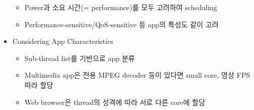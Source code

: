 \begin{itemize}
    \begin{itemize}
        \item Power과 소요 시간(= performance)를 모두 고려하여 scheduling
        \item Performance-sensitive/QoS-sensitive 등 app의 특성도 같이 고려
    \end{itemize}
    \item Considering App Characteristics
    \begin{itemize}
        \item Sub-thread list를 기반으로 app 분류
        \item Multimedia app은 전용 MPEG decoder 등이 있다면 small core, 영상 FPS 따라 할당
        \item Web browser은 thread의 성격에 따라 서로 다른 core에 할당
    \end{itemize}
\end{itemize}
